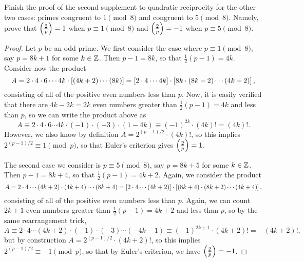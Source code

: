 \documentclass{article}
\newcommand{\leg}[2]{\paren{\frac{#1}{#2}}}
\begin{document}
\begin{exercise}[Chapter 21, \#4]
Finish the proof of the second supplement to quadratic reciprocity for the other two cases: primes congruent to $1\pmod 8$ and congruent to $5\pmod 8$. Namely, prove that $\leg 2p = 1$ when $p\equiv 1\pmod 8$ and $\leg 2p = -1$ when $p\equiv 5\pmod 8$.
\end{exercise}
\begin{proof}
Let $p$ be an odd prime. We first consider the case where $p\equiv 1\pmod 8$, say $p = 8k+1$ for some $k\in\mathbb Z$. Then $p-1 = 8k$, so that $\frac 12(p-1) = 4k$. Consider now the product 
$$A = 2\cdot 4\cdot 6\cdots 4k \cdot [(4k+2) \cdots (8k)] = \left[2\cdot 4\cdots 4k\right] \cdot \left[8k \cdot (8k-2) \cdots (4k+2)\right],$$
consisting of all of the positive even numbers less than $p$. Now, it is easily verified that there are $4k-2k = 2k$ even numbers greater than $\frac 12(p-1) = 4k$ and less than $p$, so we can write the product above as
$$A \equiv 2\cdot 4\cdot 6\cdots 4k \cdot (-1)\cdot (-3) \cdot (1-4k) \equiv (-1)^{2k} \cdot (4k)!  = (4k)!.$$
However, we also know by definition $A = 2^{(p-1)/2} \cdot (4k)!$, so this implies $2^{(p-1)/2} \equiv 1\pmod p$, so that Euler's criterion gives $\leg 2p = 1$.

The second case we consider is $p\equiv 5\pmod 8$, say $p = 8k+5$ for some $k\in\mathbb Z$. Then $p-1 = 8k+4$, so that $\frac 12(p-1) = 4k+2$. Again, we consider the product
$$A = 2\cdot 4\cdots (4k+2) \cdot (4k+4) \cdots (8k+4) = \left[2\cdot 4\cdots (4k+2)\right] \cdot \left[(8k+4) \cdot (8k+2) \cdots (4k+4)\right],$$
consisting of all of the positive even numbers less than $p$. Again, we can count $2k+1$ even numbers greater than $\frac 12(p-1) = 4k+2$ and less than $p$, so by the same rearrangement trick,
$$A\equiv 2\cdot 4\cdots (4k+2) \cdot (-1) \cdot (-3) \cdots (-4k-1) \equiv (-1)^{2k+1} \cdot (4k+2)! = -(4k+2)!,$$
but by construction $A = 2^{(p-1)/2} \cdot (4k+2)!$, so this implies $2^{(p-1)/2} \equiv -1\pmod p$, so that by Euler's criterion, we have $\leg 2p = -1$.
\end{proof}
\end{document}

